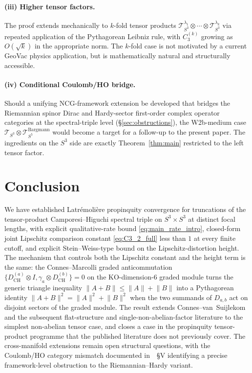 \documentclass[11pt,a4paper]{article}
\theoremstyle{plain}
\theoremstyle{definition}
\newcommand{\sthree}{S^{3}}
\newcommand{\Tcal}{\mathcal{T}}
\newcommand{\norm}[1]{\lVert #1 \rVert}
\newcommand{\DCH}{D_{\mathrm{CH}}}
\begin{document}
\paragraph{(iii) Higher tensor factors.} The proof extends mechanically
to $k$-fold tensor products $\Tcal_{\sthree}^{\lambda_1} \otimes \cdots
\otimes \Tcal_{\sthree}^{\lambda_k}$ via repeated application of the
Pythagorean Leibniz rule, with $C_3^{(k)}$ growing as $O(\sqrt{k})$ in
the appropriate norm. The $k$-fold case is not motivated by a current
GeoVac physics application, but is mathematically natural and
structurally accessible.

\paragraph{(iv) Conditional Coulomb/HO bridge.} Should a unifying
NCG-framework extension be developed that bridges the Riemannian
spinor Dirac and Hardy-sector first-order complex operator categories
at the spectral-triple level (\S\ref{sec:obstructions}), the
W2b-medium case
$\Tcal_{\sthree} \otimes \Tcal_{S^5}^{\mathrm{Bargmann}}$ would become
a target for a follow-up to the present paper. The ingredients on the
$\sthree$ side are exactly Theorem~\ref{thm:main} restricted to the
left tensor factor.

\section{Conclusion}\label{sec:conclusion}

We have established Latr\'emoli\`ere propinquity convergence for
truncations of the tensor-product Camporesi--Higuchi spectral triple
on $\sthree \times \sthree$ at distinct focal lengths, with explicit
qualitative-rate bound \eqref{eq:main_rate_intro}, closed-form
joint Lipschitz comparison constant \eqref{eq:C3_2_full} less than $1$
at every finite cutoff, and explicit Stein--Weiss-type bound on the
Lipschitz-distortion height. The mechanism that controls both the
Lipschitz constant and the height term is the same: the
Connes--Marcolli graded anticommutation
$\{\DCH^{(a)} \otimes I, \gamma_a \otimes \DCH^{(b)}\} = 0$ on the
KO-dimension-6 graded module turns the generic triangle inequality
$\norm{A + B} \le \norm{A} + \norm{B}$ into a Pythagorean identity
$\norm{A + B}^2 = \norm{A}^2 + \norm{B}^2$ when the two summands of
$D_{a,b}$ act on disjoint sectors of the graded module. The result
extends Connes--van~Suijlekom~\cite{connes_vs2021} and the subsequent
flat-structure and single-non-abelian-factor literature
\cite{hekkelman2022, hekkelman_mcdonald2024, leimbach_vs2024,
loutey_paper38} to the simplest non-abelian tensor case, and closes a
case in the propinquity tensor-product programme that the published
literature does not previously cover. The cross-manifold extensions
remain open structural questions, with the Coulomb/HO category
mismatch documented in~\cite{paper24}~\S V identifying a precise
framework-level obstruction to the Riemannian--Hardy variant.
\end{document}
